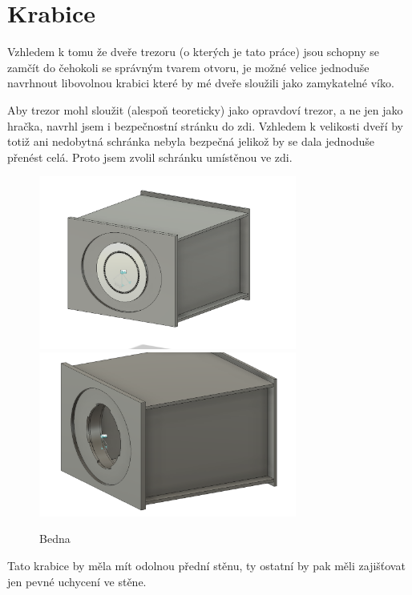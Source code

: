 \section{Krabice}
Vzhledem k tomu že dveře trezoru (o kterých je tato práce) jsou schopny se zamčít do čehokoli se správným tvarem otvoru, je možné velice jednoduše navrhnout libovolnou krabici které by mé 
dveře sloužili jako zamykatelné víko. 

Aby trezor mohl sloužit (alespoň teoreticky) jako opravdoví trezor, a ne jen jako hračka, navrhl jsem i bezpečnostní stránku do zdi. Vzhledem k velikosti dveří by totiž ani nedobytná schránka 
nebyla bezpečná jelikož by se dala jednoduše přenést celá. Proto jsem zvolil schránku umístěnou ve zdi. 

\begin{figure}[htbp]
    \centering
    \includegraphics[width=240pt]{kapitoly/obrazky/E4/bedna/bedna.png}
    \includegraphics[width=240pt]{kapitoly/obrazky/E4/bedna/jen-bedna.png}
    \caption{Bedna}
    \label{fig:E4-bedna}
\end{figure}

Tato krabice by měla mít odolnou přední stěnu, ty ostatní by pak měli zajišťovat jen pevné uchycení ve stěne.